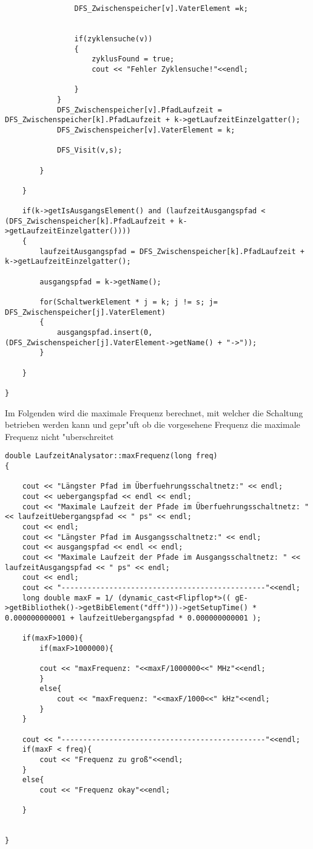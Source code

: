 \documentclass[11pt]{article}
\begin{document}
\begin{lstlisting}
                DFS_Zwischenspeicher[v].VaterElement =k;


                if(zyklensuche(v))
                {
                    zyklusFound = true;
                    cout << "Fehler Zyklensuche!"<<endl;

                }
            }
            DFS_Zwischenspeicher[v].PfadLaufzeit = DFS_Zwischenspeicher[k].PfadLaufzeit + k->getLaufzeitEinzelgatter();
            DFS_Zwischenspeicher[v].VaterElement = k;

            DFS_Visit(v,s);

        }

    }

    if(k->getIsAusgangsElement() and (laufzeitAusgangspfad < (DFS_Zwischenspeicher[k].PfadLaufzeit + k->getLaufzeitEinzelgatter())))
    {
        laufzeitAusgangspfad = DFS_Zwischenspeicher[k].PfadLaufzeit + k->getLaufzeitEinzelgatter();

        ausgangspfad = k->getName();

        for(SchaltwerkElement * j = k; j != s; j= DFS_Zwischenspeicher[j].VaterElement)
        {
            ausgangspfad.insert(0,(DFS_Zwischenspeicher[j].VaterElement->getName() + "->"));
        }

    }

}
\end{lstlisting}



Im Folgenden wird die maximale Frequenz berechnet, mit welcher die Schaltung betrieben werden kann und gepr"uft ob die vorgesehene Frequenz die maximale Frequenz nicht "uberschreitet

\begin{lstlisting}
double LaufzeitAnalysator::maxFrequenz(long freq)
{

    cout << "Längster Pfad im Überfuehrungsschaltnetz:" << endl;
    cout << uebergangspfad << endl << endl;
    cout << "Maximale Laufzeit der Pfade im Überfuehrungsschaltnetz: " << laufzeitUebergangspfad << " ps" << endl;
    cout << endl;
    cout << "Längster Pfad im Ausgangsschaltnetz:" << endl;
    cout << ausgangspfad << endl << endl;
    cout << "Maximale Laufzeit der Pfade im Ausgangsschaltnetz: " << laufzeitAusgangspfad << " ps" << endl;
    cout << endl;
    cout << "-----------------------------------------------"<<endl;
    long double maxF = 1/ (dynamic_cast<Flipflop*>(( gE->getBibliothek()->getBibElement("dff")))->getSetupTime() * 0.000000000001 + laufzeitUebergangspfad * 0.000000000001 );

    if(maxF>1000){
        if(maxF>1000000){

        cout << "maxFrequenz: "<<maxF/1000000<<" MHz"<<endl;
        }
        else{
            cout << "maxFrequenz: "<<maxF/1000<<" kHz"<<endl;
        }
    }

    cout << "-----------------------------------------------"<<endl;
    if(maxF < freq){
        cout << "Frequenz zu groß"<<endl;
    }
    else{
        cout << "Frequenz okay"<<endl;

    }


}
\end{lstlisting}

\begin{lstlisting}
\end{lstlisting}
\end{document}
